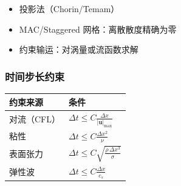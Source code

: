\begin{itemize}
  \item 投影法（Chorin/Temam）
  \item MAC/Staggered 网格：离散散度精确为零
  \item 约束输运：对涡量或流函数求解
\end{itemize}

\subsubsection{时间步长约束}

\begin{center}
\begin{tabular}{ll}
\toprule
\textbf{约束来源} & \textbf{条件} \\
\midrule
对流（CFL） & $\Delta t \leq C\frac{\Delta x}{|\mathbf{u}|_{\max}}$ \\
粘性 & $\Delta t \leq C\frac{\Delta x^2}{\nu}$ \\
表面张力 & $\Delta t \leq C\sqrt{\frac{\rho\,\Delta x^3}{\sigma}}$ \\
弹性波 & $\Delta t \leq C\frac{\Delta x}{c_s}$ \\
\bottomrule
\end{tabular}
\end{center}